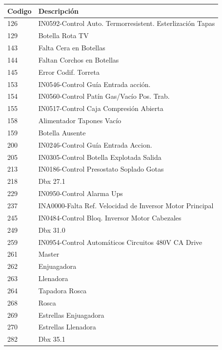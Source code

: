 \documentclass[10pt]{article}
\begin{document}
\begin{table}[!ht]
    \centering
    \begin{tabular}{|l|l|}
    \hline
    Codigo & Descripción \\ \hline
    126 & IN0592-Control Auto. Termorresistent. Esterlización Tapas \\ \hline
        129 & Botella Rota TV \\ \hline
        143 & Falta Cera en Botellas \\ \hline
        144 & Faltan Corchos en Botellas \\ \hline
        145 & Error Codif. Torreta \\ \hline
        153 & IN0546-Control Guía Entrada acción. \\ \hline
        154 & IN0560-Control Patí­n Gas/Vacío Pos. Trab. \\ \hline
        155 & IN0517-Control Caja Compresión Abierta \\ \hline
        158 & Alimentador Tapones Vacío \\ \hline
        159 & Botella Ausente \\ \hline
        200 & IN0246-Control Guía Entrada Accion. \\ \hline
        205 & IN0305-Control Botella Explotada Salida \\ \hline
        213 & IN0186-Control Presostato Soplado Gotas \\ \hline
        218 & Dbx 27.1 \\ \hline
        229 & IN0950-Control Alarma Ups \\ \hline
        237 & INA0000-Falta Ref. Velocidad de Inversor Motor Principal \\ \hline
      245 & IN0484-Control Bloq. Inversor Motor Cabezales  \\ \hline
        249 & Dbx 31.0 \\ \hline
        259 & IN0954-Control Automáticos Circuitos 480V CA Drive \\ \hline
        261 & Master \\ \hline
        262 & Enjuagadora \\ \hline
        263 & Llenadora \\ \hline
        264 & Tapadora Rosca \\ \hline
        268 & Rosca \\ \hline
        269 & Estrellas Enjuagadora \\ \hline
        270 & Estrellas Llenadora \\ \hline
        282 & Dbx 35.1 \\ \hline

\end{tabular}
\end{table}
\end{document}
